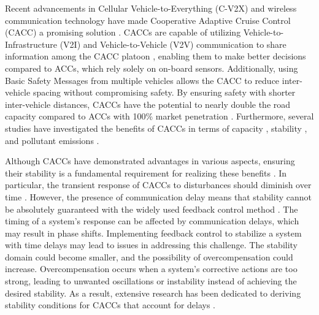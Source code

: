 \documentclass[a4paper]{cas-sc}
\begin{document}
Recent advancements in Cellular Vehicle-to-Everything (C-V2X) and wireless communication technology have made Cooperative Adaptive Cruise Control (CACC) a promising solution \citep{hua2020influence,yu2022safety}. CACCs are capable of utilizing Vehicle-to-Infrastructure (V2I) and Vehicle-to-Vehicle (V2V) communication to share information among the CACC platoon \citep{Wang2022,Qin2021a}, enabling them to make better decisions compared to ACCs, which rely solely on on-board sensors. Additionally, using Basic Safety Messages from multiple vehicles allows the CACC to reduce inter-vehicle spacing without compromising safety. By ensuring safety with shorter inter-vehicle distances, CACCs have the potential to nearly double the road capacity compared to ACCs with 100\% market penetration \citep{Xing2020,ruan2021stability}. Furthermore, several studies have investigated the benefits of CACCs in terms of capacity \citep{Gong2018a,yu2022stability}, stability \citep{Zhou2019c,Talebpour2017a}, and pollutant emissions \citep{Wang2022,schmied2015nonlinear}.




Although CACCs have demonstrated advantages in various aspects, ensuring their stability is a fundamental requirement for realizing these benefits \citep{orosz2016connected}. In particular, the transient response of CACCs to disturbances should diminish over time \citep{jiang2018experimental}. However, the presence of communication delay means that stability cannot be absolutely guaranteed with the widely used feedback control method \citep{amirkhani2022consensus,bao2022recent}. The timing of a system's response can be affected by communication delays, which may result in phase shifts. Implementing feedback control to stabilize a system with time delays may lead to issues in addressing this challenge. The stability domain could become smaller, and the possibility of overcompensation could increase. Overcompensation occurs when a system's corrective actions are too strong, leading to unwanted oscillations or instability instead of achieving the desired stability. As a result, extensive research has been dedicated to deriving stability conditions for CACCs that account for delays \citep{herman1959traffic, zhang1997stability, li2010lyapunov, li2013stability, kamath2015car, sun_stability_2018}.
\end{document}
